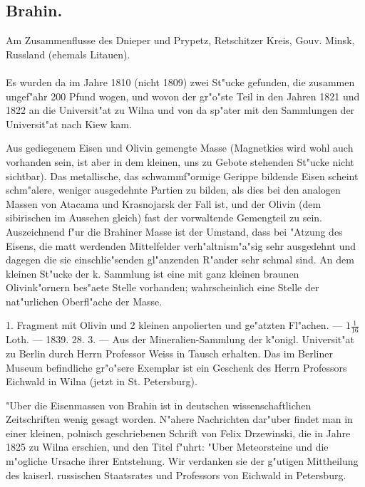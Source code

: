 \documentclass[a4paper, 11pt, oneside, polutonikogreek, german]{article}
\begin{document}
\subsection{Brahin.}
\begin{center}
\small
Am Zusammenflusse des Dnieper und Prypetz, Retschitzer Kreis, Gouv. Minsk, Russland (ehemals Litauen).
\end{center}
\paragraph{}
Es wurden da im Jahre 1810 (nicht 1809) zwei St"ucke gefunden, die zusammen ungef"ahr 200 Pfund wogen, und wovon der gr"o"ste Teil in den Jahren 1821 und 1822 an die Universit"at zu Wilna und von da sp"ater mit den Sammlungen der Universit"at nach Kiew kam.

Aus gediegenem Eisen und Olivin gemengte Masse (Magnetkies wird wohl auch vorhanden sein, ist aber in dem kleinen, uns zu Gebote stehenden St"ucke nicht sichtbar). Das metallische, das schwammf"ormige Gerippe bildende Eisen scheint schm"alere, weniger ausgedehnte Partien zu bilden, als dies bei den analogen Massen von Atacama und Krasnojarsk der Fall ist, und der Olivin (dem sibirischen im Aussehen gleich) fast der vorwaltende Gemengteil zu sein. Auszeichnend f"ur die Brahiner Masse ist der Umstand, dass bei "Atzung des Eisens, die matt werdenden Mittelfelder verh"altnism"a"sig sehr ausgedehnt und dagegen die sie einschlie"senden gl"anzenden R"ander sehr schmal sind. An dem kleinen St"ucke der k. Sammlung ist eine mit ganz kleinen braunen Olivink"ornern bes"aete Stelle vorhanden; wahrscheinlich eine Stelle der nat"urlichen Oberfl"ache der Masse.

1. Fragment mit Olivin und 2 kleinen anpolierten und ge"atzten Fl"achen. --- $1\frac{1}{16}$ Loth. --- 1839. 28. 3. --- Aus der Mineralien-Sammlung der k"onigl. Universit"at zu Berlin durch Herrn Professor Weiss in Tausch erhalten. Das im Berliner Museum befindliche gr"o"sere Exemplar ist ein Geschenk des Herrn Professors Eichwald in Wilna (jetzt in St. Petersburg).

\setlength{\leftskip}{10mm}
\setlength{\parindent}{0pt}

{\footnotesize "Uber die Eisenmassen von Brahin ist in deutschen wissenschaftlichen Zeitschriften wenig gesagt worden. N"ahere Nachrichten dar"uber findet man in einer kleinen, polnisch geschriebenen Schrift von Felix Drzewinski, die in Jahre 1825 zu Wilna erschien, und den Titel f"uhrt: "Uber Meteorsteine und die m"ogliche Ursache ihrer Entstehung. Wir verdanken sie der g"utigen Mittheilung des kaiserl. russischen Staatsrates und Professors von Eichwald in Petersburg.}
\end{document}
